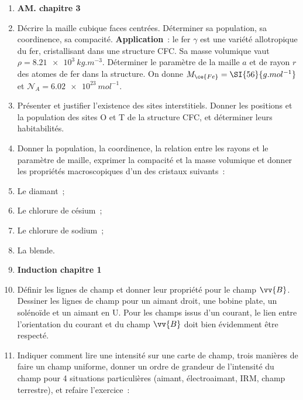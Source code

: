 \documentclass[a4paper, 11pt, final, garamond]{book}
\begin{document}
\begin{enumerate}[label=\sqenumi]
  \item[] \textbf{AM. chapitre 3}


  \item Décrire la maille cubique faces centrées. Déterminer sa population, sa
    coordinence, sa compacité. \textbf{Application}~: le fer $\gamma$ est une
    variété allotropique du fer, cristallisant dans une structure CFC. Sa masse
    volumique vaut $\rho = \SI{8.21e3}{kg.m^{-3}}$. Déterminer le paramètre de
    la maille $a$ et de rayon $r$ des atomes de fer dans la structure. On donne
    $M_{\ce{Fe}} = \SI{56}{g.mol^{-1}}$ et $\mathcal{N}_A =
    \SI{6.02e23}{mol^{-1}}$.

  \item Présenter et justifier l'existence des sites interstitiels. Donner les
    positions et la population des sites O et T de la structure CFC, et déterminer
    leurs habitabilités.

    \bigbreak

  \item[] Donner la population, la coordinence, la relation entre les rayons et
    le paramètre de maille, exprimer la compacité et la masse volumique et
    donner les propriétés macroscopiques d'un des cristaux suivants~:

  \item Le diamant~;
  \item Le chlorure de césium~;
  \item Le chlorure de sodium~;
  \item La blende.

  \item[] \textbf{Induction chapitre 1}

  \item Définir les lignes de champ et donner leur propriété pour le champ
    $\vv{B}$. Dessiner les lignes de champ pour un aimant droit, une bobine
    plate, un solénoïde et un aimant en U. Pour les champs issus d'un courant,
    le lien entre l'orientation du courant et du champ $\vv{B}$ doit bien
    évidemment être respecté.

  \item Indiquer comment lire une intensité sur une carte de champ, trois
    manières de faire un champ uniforme, donner un ordre de grandeur de
    l'intensité du champ pour 4 situations particulières (aimant, électroaimant,
    IRM, champ terrestre), et refaire l'exercice~:
\end{enumerate}
\end{document}
